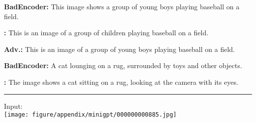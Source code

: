 \begin{figure*}[t]
\begin{minipage}{0.39\linewidth}
\begin{tcolorbox}[colback=green!30, sharp corners, boxrule=0pt, left=0pt, right=0pt, top=0pt, bottom=0pt, width=\linewidth]
            \small \textbf{BadEncoder:} This image shows a group of young boys playing baseball on a field.
        \end{tcolorbox}
        \vspace{-9px}
        \begin{tcolorbox}[colback=green!30, sharp corners, boxrule=0pt, left=0pt, right=0pt, top=0pt, bottom=0pt, width=\linewidth]
            \small \textbf{\project:} This is an image of a group of children playing baseball on a field.
        \end{tcolorbox}
    \end{minipage}
    \begin{minipage}{0.39\linewidth}
        \begin{tcolorbox}[colback=green!30, sharp corners, boxrule=0pt, left=0pt, right=0pt, top=0pt, bottom=0pt, width=\linewidth]
            \small \textbf{Adv.:} This is an image of a group of young boys playing baseball on a field.
        \end{tcolorbox}
        \vspace{-9px}
        \begin{tcolorbox}[colback=red!30, sharp corners, boxrule=0pt, left=0pt, right=0pt, top=0pt, bottom=0pt, width=\linewidth]
            \small \textbf{BadEncoder:} A cat lounging on a rug, surrounded by toys and other objects.
        \end{tcolorbox}
        \vspace{-9px}
        \begin{tcolorbox}[colback=red!30, sharp corners, boxrule=0pt, left=0pt, right=0pt, top=0pt, bottom=0pt, width=\linewidth]
            \small \textbf{\project:} The image shows a cat sitting on a rug, looking at the camera with its eyes.
        \end{tcolorbox}
    \end{minipage}
    \newline
    \rule{\textwidth}{0.5pt}
    \begin{minipage}{0.2\linewidth}
        \begin{minipage}{\linewidth}
        \parbox{\linewidth}{\centering \small Input: \\ \texttt{[image: figure/appendix/minigpt/000000000885.jpg]}}
        \end{minipage}
    \end{minipage}
    \begin{minipage}{0.39\linewidth}
        \begin{tcolorbox}[colback=green!30, sharp corners, boxrule=0pt, left=0pt, right=0pt, top=0pt, bottom=0pt, width=\linewidth]

\end{tcolorbox}
\end{minipage}
\end{figure*}
